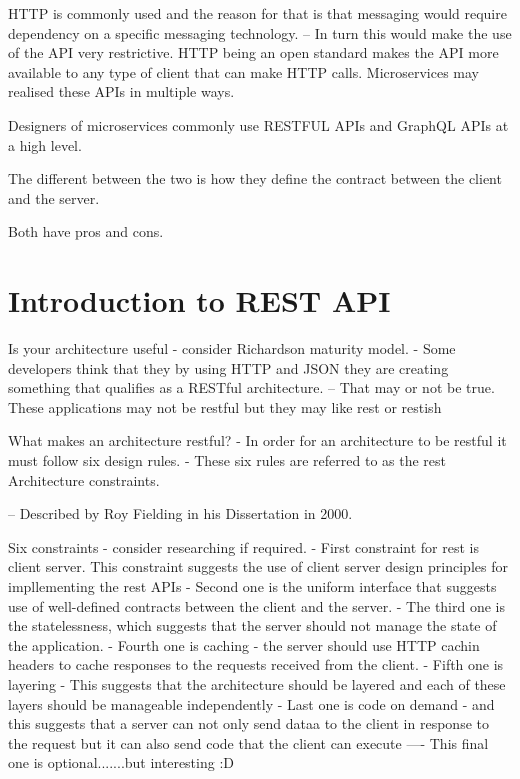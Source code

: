 HTTP is commonly used and the reason for that is that messaging would require dependency on a specific messaging technology.
-- In turn this would make the use of the API very restrictive.
HTTP being an open standard makes the API more available to any type of client that can make HTTP calls.
Microservices may realised these APIs in multiple ways.

Designers of microservices commonly use RESTFUL APIs and GraphQL APIs at a high level.

The different between the two is how they define the contract between the client and the server.

Both have pros and cons.

\section{Introduction to REST API}

Is your architecture useful - consider Richardson maturity model.
- Some developers think that they by using HTTP and JSON they are creating something that qualifies as a RESTful architecture.
-- That may or not be true.
These applications may not be restful but they may like rest or restish

What makes an architecture restful?
- In order for an architecture to be restful it must follow six design rules.
- These six rules are referred to as the rest Architecture constraints.

-- Described by Roy Fielding in his Dissertation in 2000.

Six constraints - consider researching if required.
- First constraint for rest is client server. This constraint suggests the use of client server design principles for impllementing the rest APIs
- Second one is the uniform interface that suggests use of well-defined contracts between the client and the server.
- The third one is the statelessness, which suggests that the server should not manage the state of the application.
- Fourth one is caching - the server should use HTTP cachin headers to cache responses to the requests received from the client.
- Fifth one is layering - This suggests that the architecture should be layered and each of these layers should be manageable independently
- Last one is code on demand - and this suggests that a server can not only send dataa to the client in response to the request but it can also send code that the client can execute
---- This final one is optional.......but interesting :D

